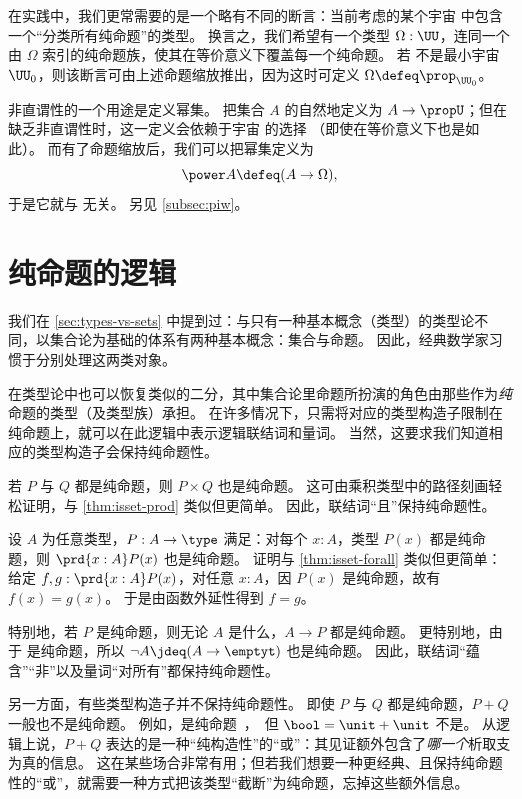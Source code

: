 在实践中，我们更常需要的是一个略有不同的断言：当前考虑的某个宇宙 \UU 中包含一个“分类所有纯命题”的类型。
换言之，我们希望有一个类型 $\Omega:\UU$，连同一个由 $\Omega$ 索引的纯命题族，使其在等价意义下覆盖每一个纯命题。
若 \UU 不是最小宇宙 $\UU_0$，则该断言可由上述命题缩放推出，因为这时可定义 $\Omega\defeq \prop_{\UU_0}$。

非直谓性的一个用途是定义幂集。
把集合 $A$ 的自然地定义为 $A\to\propU$；但在缺乏非直谓性时，这一定义会依赖于宇宙 \UU 的选择
（即使在等价意义下也是如此）。
而有了命题缩放后，我们可以把幂集定义为
%
\[ \power A \defeq (A\to\Omega),\]
于是它就与 \UU 无关。
另见 \cref{subsec:piw}。

\section{纯命题的逻辑}
\label{subsec:logic-hprop}

%
我们在 \cref{sec:types-vs-sets} 中提到过：与只有一种基本概念（类型）的类型论不同，以集合论为基础的体系有两种基本概念：集合与命题。
因此，经典数学家习惯于分别处理这两类对象。

在类型论中也可以恢复类似的二分，其中集合论里命题所扮演的角色由那些作为\emph{纯}命题的类型（及类型族）承担。
在许多情况下，只需将对应的类型构造子限制在纯命题上，就可以在此逻辑中表示逻辑联结词和量词。
当然，这要求我们知道相应的类型构造子会保持纯命题性。

\begin{eg}
  若 $P$ 与 $Q$ 都是纯命题，则 $P\times Q$ 也是纯命题。
  这可由乘积类型中的路径刻画轻松证明，与 \cref{thm:isset-prod} 类似但更简单。
  因此，联结词“且”保持纯命题性。
\end{eg}

\begin{eg}\label{thm:isprop-forall}
  设 $A$ 为任意类型，$P:A\to \type$ 满足：对每个 $x:A$，类型 $P(x)$ 都是纯命题，则 $\prd{x:A} P(x)$ 也是纯命题。
  证明与 \cref{thm:isset-forall} 类似但更简单：给定 $f,g:\prd{x:A} P(x)$，对任意 $x:A$，因 $P(x)$ 是纯命题，故有 $f(x)=g(x)$。
  于是由函数外延性得到 $f=g$。

  特别地，若 $P$ 是纯命题，则无论 $A$ 是什么，$A\to P$ 都是纯命题。
  更特别地，由于 \emptyt 是纯命题，所以 $\neg A \jdeq (A\to\emptyt)$ 也是纯命题。
  因此，联结词“蕴含”“非”以及量词“对所有”都保持纯命题性。
\end{eg}

另一方面，有些类型构造子并不保持纯命题性。
即使 $P$ 与 $Q$ 都是纯命题，$P+Q$ 一般也不是纯命题。
例如，\unit 是纯命题，但 $\bool=\unit+\unit$ 不是。
从逻辑上说，$P+Q$ 表达的是一种“纯构造性”的“或”：其见证额外包含了\emph{哪一个}析取支为真的信息。
这在某些场合非常有用；但若我们想要一种更经典、且保持纯命题性的“或”，就需要一种方式把该类型“截断”为纯命题，忘掉这些额外信息。

